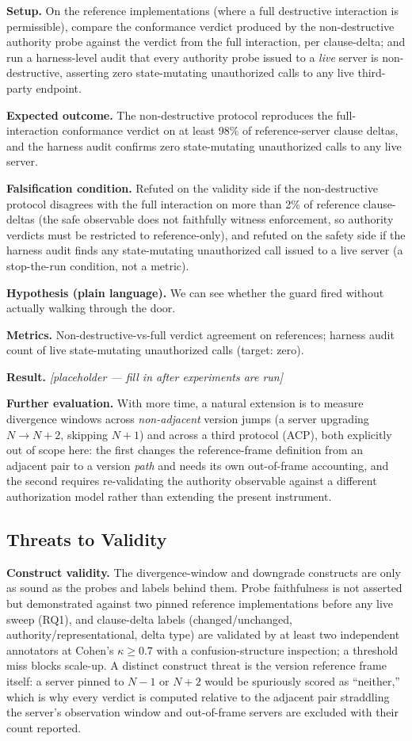 \documentclass[11pt]{article}
\newcommand{\ph}{\textit{[placeholder --- fill in after experiments are run]}}
\begin{document}
\textbf{Setup.} On the reference implementations (where a full destructive interaction is permissible), compare the conformance verdict produced by the non-destructive authority probe against the verdict from the full interaction, per clause-delta; and run a harness-level audit that every authority probe issued to a \emph{live} server is non-destructive, asserting zero state-mutating unauthorized calls to any live third-party endpoint.

\textbf{Expected outcome.} The non-destructive protocol reproduces the full-interaction conformance verdict on at least 98\% of reference-server clause deltas, and the harness audit confirms zero state-mutating unauthorized calls to any live server.

\textbf{Falsification condition.} Refuted on the validity side if the non-destructive protocol disagrees with the full interaction on more than 2\% of reference clause-deltas (the safe observable does not faithfully witness enforcement, so authority verdicts must be restricted to reference-only), and refuted on the safety side if the harness audit finds any state-mutating unauthorized call issued to a live server (a stop-the-run condition, not a metric).

\textbf{Hypothesis (plain language).} We can see whether the guard fired without actually walking through the door.

\textbf{Metrics.} Non-destructive-vs-full verdict agreement on references; harness audit count of live state-mutating unauthorized calls (target: zero).

\textbf{Result.} \ph

\textbf{Further evaluation.} With more time, a natural extension is to measure divergence windows across \emph{non-adjacent} version jumps (a server upgrading $N \to N{+}2$, skipping $N{+}1$) and across a third protocol (ACP), both explicitly out of scope here: the first changes the reference-frame definition from an adjacent pair to a version \emph{path} and needs its own out-of-frame accounting, and the second requires re-validating the authority observable against a different authorization model rather than extending the present instrument.

\subsection{Threats to Validity}

\textbf{Construct validity.} The divergence-window and downgrade constructs are only as sound as the probes and labels behind them. Probe faithfulness is not asserted but demonstrated against two pinned reference implementations before any live sweep (RQ1), and clause-delta labels (changed/unchanged, authority/representational, delta type) are validated by at least two independent annotators at Cohen's $\kappa \geq 0.7$ with a confusion-structure inspection; a threshold miss blocks scale-up. A distinct construct threat is the version reference frame itself: a server pinned to $N{-}1$ or $N{+}2$ would be spuriously scored as ``neither,'' which is why every verdict is computed relative to the adjacent pair straddling the server's observation window and out-of-frame servers are excluded with their count reported.
\end{document}
